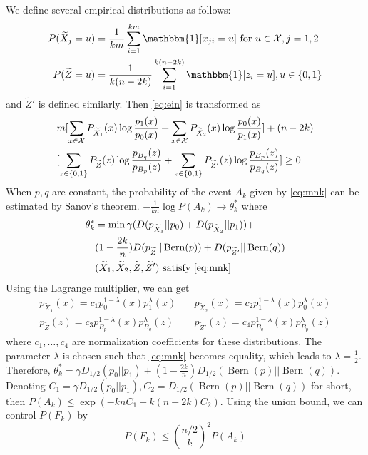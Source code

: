 \documentclass[conference,letterpaper]{IEEEtran}
\DeclareMathOperator{\Bern}{Bern}
\begin{document}
We define several empirical distributions as follows: 
\begin{align*}
P(\widetilde{X}_j = u) &= \frac{1}{km} \sum_{i=1}^{km} \mathbbm{1}[x_{ji} = u] \textrm{ for } u \in \mathcal{X}, j=1,2 \\
P(\widetilde{Z} = u) &= \frac{1}{k(n-2k)}\sum_{i=1}^{k(n-2k)} \mathbbm{1}[z_i = u], u \in \{0, 1\}
\end{align*}
and $\widetilde{Z}'$ is defined similarly. Then
\eqref{eq:ein} is transformed as
\begin{align}
&m[\sum_{x\in \mathcal{X}}P_{\widetilde{X}_1}(x)\log\frac{p_1(x)}{p_0(x)}
+\sum_{x\in \mathcal{X}}P_{\widetilde{X}_2}(x)\log\frac{p_0(x)}{p_1(x)}] +(n-2k)\notag \\
&[\sum_{z\in\{0,1\}} P_{\widetilde{Z}}(z) \log \frac{p_{B_q}(z)}{p_{B_p}(z)}
+ \sum_{z\in\{0,1\}} P_{\widetilde{Z}'}(z) \log \frac{p_{B_p}(z)}{p_{B_q}(z)}] \geq 0 \label{eq:mnk}
\end{align}
When $p,q$ are constant, the probability of the event $A_k$ given by \eqref{eq:mnk} can be estimated by Sanov's theorem.
$-\frac{1}{kn}\log P(A_k) \to \theta^*_k$ where 
\begin{align*}
\theta^*_k &= \min \gamma (D(p_{\widetilde{X}_1}||p_0) + D(p_{\widetilde{X}_2}||p_1)) + \\
&(1-\frac{2k}{n})D(p_{\widetilde{Z}}||\Bern(p)) + D(p_{\widetilde{Z}'}||\Bern(q))  \\
& (\widetilde{X}_1, \widetilde{X}_2, \widetilde{Z}, \widetilde{Z}')
\textrm{ satisfy } \eqref{eq:mnk}
\end{align*}
Using the Lagrange multiplier, we can get
\begin{align*}
p_{\widetilde{X}_1}(x) = c_1 p_0^{1-\lambda}(x)p_1^{\lambda}(x)\quad & p_{\widetilde{X}_2}(x) = c_2 p_1^{1-\lambda}(x)p_0^{\lambda}(x) \\
p_{\widetilde{Z}}(z) = c_3 p_{B_p}^{1-\lambda}(x)p_{B_q}^{\lambda}(z)\quad &
p_{\widetilde{Z}'}(z) = c_4 p_{B_q}^{1-\lambda}(x)p_{B_p}^{\lambda}(z)
\end{align*}
where $c_1, \dots, c_4$ are normalization coefficients for these distributions.
The parameter $\lambda$ is chosen such that \eqref{eq:mnk} becomes equality, which leads to $\lambda=\frac{1}{2}$.
Therefore, $\theta^*_k = \gamma D_{1/2}(p_0 || p_1) +(1-\frac{2k}{n}) D_{1/2}(\Bern(p)||\Bern(q))$.
Denoting $C_1=\gamma D_{1/2}(p_0 || p_1), C_2=D_{1/2}(\Bern(p)||\Bern(q))$ for short,
then $
P(A_k) \leq \exp(-knC_1-k(n-2k) C_2)
$. Using the union bound, we can control $P(F_k)$ by
\begin{equation}\label{eq:FAk}
P(F_k) \leq \binom{n/2}{k}^2 P(A_k)
\end{equation}
\end{document}
